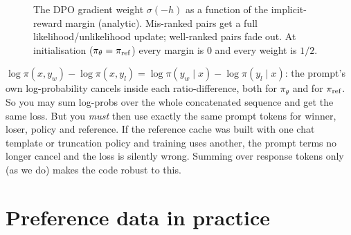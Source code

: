 \begin{figure}[t]
\centering
{}
\caption{The DPO gradient weight $\sigma(-h)$ as a function of the implicit-reward margin
(analytic). Mis-ranked pairs get a full likelihood/unlikelihood update; well-ranked pairs fade
out. At initialisation ($\pi_\theta=\pi_{\text{ref}}$) every margin is $0$ and every weight is $1/2$.}
\label{fig:dpo:grad}
\end{figure}

\begin{pitfall}
$\log\pi(x,y_w)-\log\pi(x,y_l)=\log\pi(y_w\mid x)-\log\pi(y_l\mid x)$: the prompt's own
log-probability cancels inside each ratio-difference, both for $\pi_\theta$ and for $\pi_{\text{ref}}$. So you
may sum log-probs over the whole concatenated sequence and get the same loss. But you \emph{must}
then use exactly the same prompt tokens for winner, loser, policy and reference. If the reference
cache was built with one chat template or truncation policy and training uses another, the
prompt terms no longer cancel and the loss is silently wrong. Summing over response tokens only
(as we do) makes the code robust to this.
\end{pitfall}

\section{Preference data in practice}\label{sec:dpo:data}

